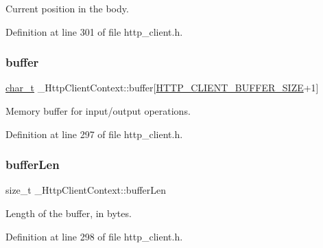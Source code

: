 Current position in the body. 



Definition at line 301 of file http\+\_\+client.\+h.

\mbox{\label{struct__HttpClientContext_a33c2de5aae0eb7ed112183775d6f3707}} 
\subsubsection{\texorpdfstring{buffer}{buffer}}
{\footnotesize\ttfamily \hyperlink{compiler__port_8h_a40bb5262bf908c328fbcfbe5d29d0201}{char\+\_\+t} \+\_\+\+Http\+Client\+Context\+::buffer\mbox{[}\hyperlink{http__client_8h_ae5dc9a5f9f9c310897f83e8f6d1c5ab3}{H\+T\+T\+P\+\_\+\+C\+L\+I\+E\+N\+T\+\_\+\+B\+U\+F\+F\+E\+R\+\_\+\+S\+I\+ZE}+1\mbox{]}}



Memory buffer for input/output operations. 



Definition at line 297 of file http\+\_\+client.\+h.

\mbox{\label{struct__HttpClientContext_a11891d23e73a3d0a910ec3fa8a9490f6}} 
\subsubsection{\texorpdfstring{buffer\+Len}{bufferLen}}
{\footnotesize\ttfamily size\+\_\+t \+\_\+\+Http\+Client\+Context\+::buffer\+Len}



Length of the buffer, in bytes. 



Definition at line 298 of file http\+\_\+client.\+h.

\mbox{\label{struct__HttpClientContext_add904e0a150e458ee87854d298de596d}} 
